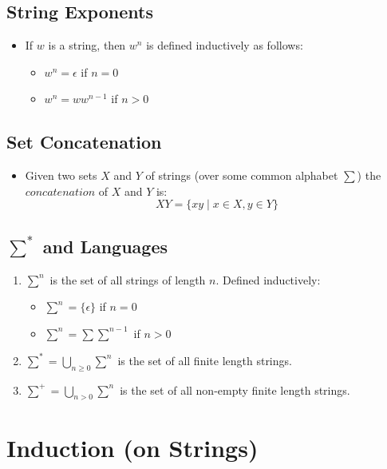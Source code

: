 \documentclass[12pt]{article}
\begin{document}
\subsection{String Exponents}
\begin{itemize}
    \item If $w$ is a string, then $w^n$ is defined inductively as follows:
        \begin{itemize}
            \item $w^n = \epsilon$ if $n = 0$
            \item $w^n = ww^{n-1}$ if $n > 0$
        \end{itemize}
\end{itemize}

\subsection{Set Concatenation}
\begin{itemize}
    \item Given two sets $X$ and $Y$ of strings (over some common alphabet $\sum$) the $concatenation$ of $X$ and $Y$ is:
    \begin{equation}
        XY = \{ xy \mid x \in X, y \in Y \}
    \end{equation}
\end{itemize}

\subsection{$\sum^{\ast}$ and Languages}
\begin{enumerate}
    \item $\sum^{n}$ is the set of all strings of length $n$. Defined inductively:
        \begin{itemize}
            \item $\sum^{n} = \{ \epsilon \}$ if $n = 0$
            \item $\sum^{n} = \sum\sum^{n-1}$ if $n > 0$
        \end{itemize}
    \item $\sum^{\ast} = \bigcup_{n \geq 0} \sum^{n}$ is the set of all finite length strings.
    \item $\sum^{+} = \bigcup_{n > 0} \sum^{n}$ is the set of all non-empty finite length strings.
\end{enumerate}

\section{Induction (on Strings)}
\end{document}
